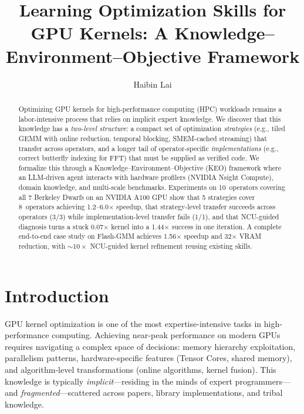 \documentclass[sigconf,nonacm]{acmart}
\title[Learning Optimization Skills for GPU Kernels]{Learning Optimization Skills for GPU Kernels: A Knowledge--Environment--Objective Framework}
\author{Haibin Lai}
\affiliation{%
  \institution{Southern University of Science and Technology}
  \city{Shenzhen}
  \country{China}
}
\begin{document}
\begin{abstract}
Optimizing GPU kernels for high-performance computing (HPC) workloads remains a labor-intensive process that relies on implicit expert knowledge. We discover that this knowledge has a \emph{two-level structure}: a compact set of optimization \emph{strategies} (e.g., tiled GEMM with online reduction, temporal blocking, SMEM-cached streaming) that transfer across operators, and a longer tail of operator-specific \emph{implementations} (e.g., correct butterfly indexing for FFT) that must be supplied as verified code. We formalize this through a Knowledge--Environment--Objective (KEO) framework where an LLM-driven agent interacts with hardware profilers (NVIDIA Nsight Compute), domain knowledge, and multi-scale benchmarks. Experiments on 10~operators covering all 7 Berkeley Dwarfs on an NVIDIA A100 GPU show that 5 strategies cover 8~operators achieving 1.2--6.0$\times$ speedup, that strategy-level transfer succeeds across operators (3/3) while implementation-level transfer fails (1/1), and that NCU-guided diagnosis turns a stuck 0.07$\times$ kernel into a 1.44$\times$ success in one iteration. A complete end-to-end case study on Flash-GMM achieves 1.56$\times$ speedup and 32$\times$ VRAM reduction, with $\sim\!10\times$ NCU-guided kernel refinement reusing existing skills.
\end{abstract}


\maketitle

\section{Introduction}

GPU kernel optimization is one of the most expertise-intensive tasks in high-performance computing. Achieving near-peak performance on modern GPUs requires navigating a complex space of decisions: memory hierarchy exploitation, parallelism patterns, hardware-specific features (Tensor Cores, shared memory), and algorithm-level transformations (online algorithms, kernel fusion). This knowledge is typically \emph{implicit}---residing in the minds of expert programmers---and \emph{fragmented}---scattered across papers, library implementations, and tribal knowledge.
\end{document}
